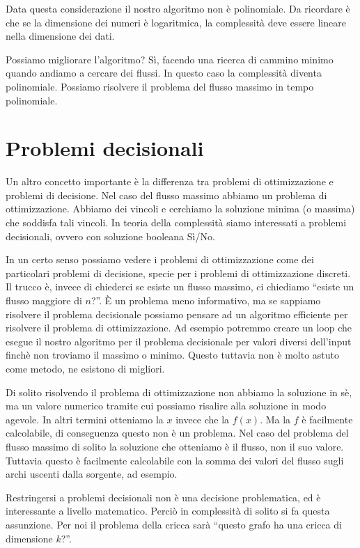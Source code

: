 Data questa considerazione il nostro algoritmo non è polinomiale. Da ricordare è che se la
dimensione dei numeri è logaritmica, la complessità deve essere lineare nella dimensione dei dati.

Possiamo migliorare l'algoritmo? Sì, facendo una ricerca di cammino minimo quando andiamo a cercare
dei flussi. In questo caso la complessità diventa polinomiale. Possiamo risolvere il problema del
flusso massimo in tempo polinomiale.

\section{Problemi decisionali}

Un altro concetto importante è la differenza tra problemi di ottimizzazione e problemi di
decisione. Nel caso del flusso massimo abbiamo un problema di ottimizzazione. Abbiamo dei vincoli e
cerchiamo la soluzione minima (o massima) che soddisfa tali vincoli. In teoria della complessità
siamo interessati a problemi decisionali, ovvero con soluzione booleana Sì/No.

In un certo senso possiamo vedere i problemi di ottimizzazione come dei particolari problemi di
decisione, specie per i problemi di ottimizzazione discreti. Il trucco è, invece di chiederci se
esiste un flusso massimo, ci chiediamo ``esiste un flusso maggiore di $n$?''. È un problema meno
informativo, ma se sappiamo risolvere il problema decisionale possiamo pensare ad un algoritmo
efficiente per risolvere il problema di ottimizzazione. Ad esempio potremmo creare un loop che
esegue il nostro algoritmo per il problema decisionale per valori diversi dell'input finchè non
troviamo il massimo o minimo. Questo tuttavia non è molto astuto come metodo, ne esistono di
migliori.

Di solito risolvendo il problema di ottimizzazione non abbiamo la soluzione in sè, ma un valore
numerico tramite cui possiamo risalire alla soluzione in modo agevole. In altri termini otteniamo la
$x$ invece che la $f(x)$. Ma la $f$ è facilmente calcolabile, di conseguenza questo non è un
problema. Nel caso del problema del flusso massimo di solito la soluzione che otteniamo è il flusso,
non il suo valore. Tuttavia questo è facilmente calcolabile con la somma dei valori del flusso
sugli archi uscenti dalla sorgente, ad esempio.

Restringersi a problemi decisionali non è una decisione problematica, ed è interessante a livello
matematico. Perciò in complessità di solito si fa questa assunzione. Per noi il problema della
cricca sarà ``questo grafo ha una cricca di dimensione $k$?''.

